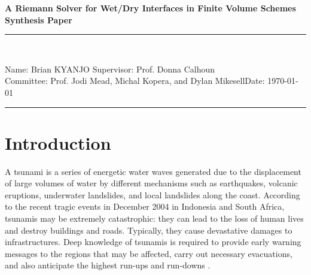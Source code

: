 \documentclass[10pt,a4paper]{article}
\newcommand{\student}{Brian KYANJO }
\newcommand{\course}{Prof. Jodi Mead, Michal Kopera, and Dylan Mikesell}
\newcommand{\assignment}{ Prof. Donna Calhoun}
\begin{document}
	
	\thispagestyle{empty}
	\begin{center}
		\textbf{A Riemann Solver for Wet/Dry Interfaces in Finite Volume Schemes\\[0.5cm]
			Synthesis Paper}
		\vspace{.2cm}
	\end{center}
	
	
	\begin{center}
		\rule{17cm}{0.2cm}\\[0.3cm]
	\end{center}	
	
	\noindent	Name: \student \hfill Supervisor: \assignment\\[0.1cm]
	Committee: \course \hfill Date: \today\\
	\rule{17cm}{0.05cm}
	\vspace{.2cm}
	
	\section{Introduction}
	
	A tsunami is a series of energetic water waves generated due to the displacement of large volumes of water by different mechanisms such as earthquakes, volcanic eruptions, underwater landslides, and local landslides along the coast. According to the recent tragic events in December 2004 in Indonesia and  South Africa, tsunamis may be extremely catastrophic: they can lead to the loss of human lives and destroy buildings and roads. Typically, they cause devastative damages to infrastructures. Deep knowledge of tsunamis is required to provide early warning messages to the regions that may be affected, carry out necessary evacuations, and also anticipate the highest run-ups and run-downs    \citep{sanchez2016uncertainty, dutykh2007water,dias2007dynamics}.
	
\end{document}
